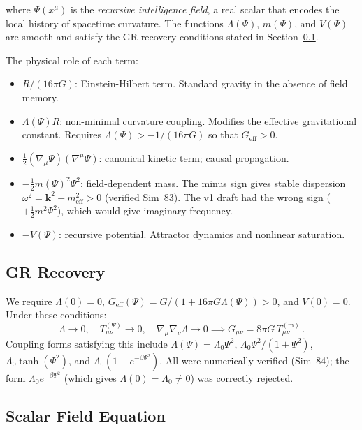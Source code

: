 \documentclass[12pt,a4paper]{article}
\begin{document}
where $\Psi(x^\mu)$ is the \emph{recursive intelligence field}, a real scalar
that encodes the local history of spacetime curvature. The functions
$\Lambda(\Psi)$, $m(\Psi)$, and $V(\Psi)$ are smooth and satisfy the GR
recovery conditions stated in Section~\ref{sec:GR_limit}.

The physical role of each term:
\begin{itemize}
  \item $R/(16\pi G)$: Einstein-Hilbert term. Standard gravity in the absence of field memory.
  \item $\Lambda(\Psi)R$: non-minimal curvature coupling. Modifies the effective gravitational constant. Requires $\Lambda(\Psi) > -1/(16\pi G)$ so that $G_{\mathrm{eff}} > 0$.
  \item $\tfrac{1}{2}(\nabla_\mu\Psi)(\nabla^\mu\Psi)$: canonical kinetic term; causal propagation.
  \item $-\tfrac{1}{2}m(\Psi)^2\Psi^2$: field-dependent mass. The minus sign gives stable dispersion $\omega^2 = \mathbf{k}^2 + m_{\mathrm{eff}}^2 > 0$ (verified Sim~83). The v1 draft had the wrong sign ($+\tfrac{1}{2}m^2\Psi^2$), which would give imaginary frequency.
  \item $-V(\Psi)$: recursive potential. Attractor dynamics and nonlinear saturation.
\end{itemize}

\subsection{GR Recovery}
\label{sec:GR_limit}

We require $\Lambda(0) = 0$, $G_{\mathrm{eff}}(\Psi) = G/(1 + 16\pi G\Lambda(\Psi)) > 0$,
and $V(0) = 0$. Under these conditions:
\begin{equation}
\Lambda \to 0,\quad T^{(\Psi)}_{\mu\nu} \to 0,\quad
\nabla_\mu\nabla_\nu\Lambda \to 0
\implies
G_{\mu\nu} = 8\pi G\,T^{(\mathrm{m})}_{\mu\nu}\,.
\end{equation}
Coupling forms satisfying this include $\Lambda(\Psi) = \Lambda_0\Psi^2$,
$\Lambda_0\Psi^2/(1+\Psi^2)$, $\Lambda_0\tanh(\Psi^2)$, and
$\Lambda_0(1-e^{-\beta\Psi^2})$. All were numerically verified (Sim~84);
the form $\Lambda_0 e^{-\beta\Psi^2}$ (which gives $\Lambda(0) = \Lambda_0 \neq 0$)
was correctly rejected.

\subsection{Scalar Field Equation}
\label{sec:scalar_eq}
\end{document}
